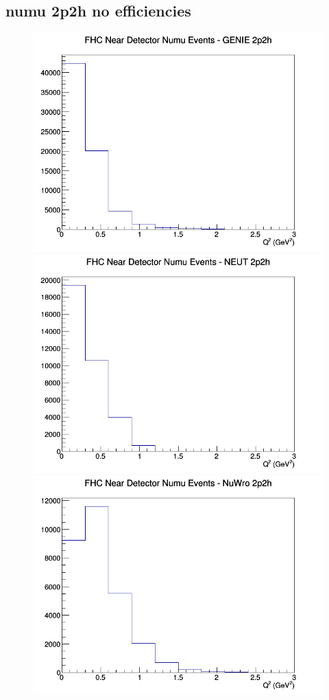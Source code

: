 \subsection{numu 2p2h no efficiencies}
\begin{figure}[h]
\includegraphics[width=\linewidth]{Q2/nominal/2p2h_FHC_ND_numu_Q2_GENIE.png}
\endminipage
{}
\includegraphics[width=\linewidth]{Q2/nominal/2p2h_FHC_ND_numu_Q2_NEUT.png}
\endminipage
{}
\includegraphics[width=\linewidth]{Q2/nominal/2p2h_FHC_ND_numu_Q2_NuWro.png}

\end{figure}
